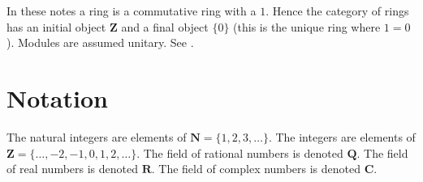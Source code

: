 \noindent
In these notes a ring is a commutative ring with a $1$. Hence the
category of rings has an initial object $\mathbf{Z}$ and a final
object $\{0\}$ (this is the unique ring where $1 = 0$). Modules are
assumed unitary. See \cite{Eisenbud}.

\section{Notation}
\label{section-notation}

\noindent
The natural integers are elements of $\mathbf{N} = \{1, 2, 3, \ldots\}$.
The integers are elements of $\mathbf{Z} = \{\ldots, -2, -1, 0, 1, 2, \ldots\}$.
The field of rational numbers is denoted $\mathbf{Q}$.
The field of real numbers is denoted $\mathbf{R}$.
The field of complex numbers is denoted $\mathbf{C}$.








